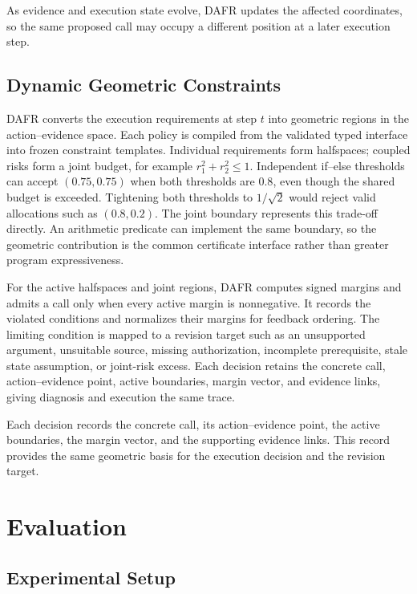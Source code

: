 \documentclass[11pt]{article}
\begin{document}
As evidence and execution state evolve, DAFR updates the affected coordinates, so the same proposed call may occupy a different position at a later execution step.

\subsection{Dynamic Geometric Constraints}

DAFR converts the execution requirements at step $t$ into geometric regions in the action--evidence space. Each policy is compiled from the validated typed interface into frozen constraint templates. Individual requirements form halfspaces; coupled risks form a joint budget, for example $r_1^2+r_2^2\leq 1$. Independent if--else thresholds can accept $(0.75,0.75)$ when both thresholds are $0.8$, even though the shared budget is exceeded. Tightening both thresholds to $1/\sqrt{2}$ would reject valid allocations such as $(0.8,0.2)$. The joint boundary represents this trade-off directly. An arithmetic predicate can implement the same boundary, so the geometric contribution is the common certificate interface rather than greater program expressiveness.

For the active halfspaces and joint regions, DAFR computes signed margins and admits a call only when every active margin is nonnegative. It records the violated conditions and normalizes their margins for feedback ordering. The limiting condition is mapped to a revision target such as an unsupported argument, unsuitable source, missing authorization, incomplete prerequisite, stale state assumption, or joint-risk excess. Each decision retains the concrete call, action--evidence point, active boundaries, margin vector, and evidence links, giving diagnosis and execution the same trace.

Each decision records the concrete call, its action--evidence point, the active boundaries, the margin vector, and the supporting evidence links. This record provides the same geometric basis for the execution decision and the revision target.

\section{Evaluation}

\subsection{Experimental Setup}
\end{document}
